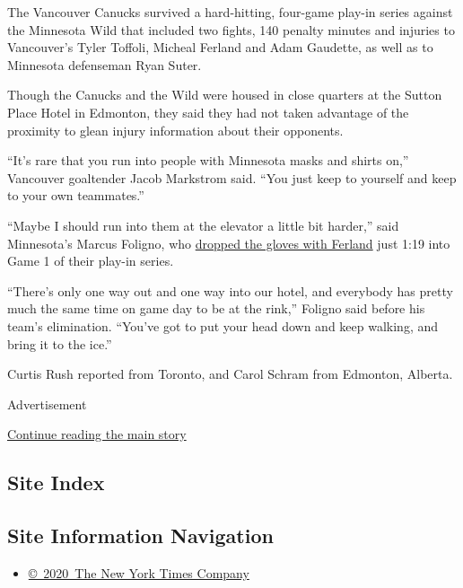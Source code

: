 The Vancouver Canucks survived a hard-hitting, four-game play-in series
against the Minnesota Wild that included two fights, 140 penalty minutes
and injuries to Vancouver's Tyler Toffoli, Micheal Ferland and Adam
Gaudette, as well as to Minnesota defenseman Ryan Suter.

Though the Canucks and the Wild were housed in close quarters at the
Sutton Place Hotel in Edmonton, they said they had not taken advantage
of the proximity to glean injury information about their opponents.

``It's rare that you run into people with Minnesota masks and shirts
on,'' Vancouver goaltender Jacob Markstrom said. ``You just keep to
yourself and keep to your own teammates.''

``Maybe I should run into them at the elevator a little bit harder,''
said Minnesota's Marcus Foligno, who
\href{https://www.youtube.com/watch?v=okGkhaQ2Xmk}{dropped the gloves
with Ferland} just 1:19 into Game 1 of their play-in series.

``There's only one way out and one way into our hotel, and everybody has
pretty much the same time on game day to be at the rink,'' Foligno said
before his team's elimination. ``You've got to put your head down and
keep walking, and bring it to the ice.''

Curtis Rush reported from Toronto, and Carol Schram from Edmonton,
Alberta.

Advertisement

\protect\hyperlink{after-bottom}{Continue reading the main story}

\hypertarget{site-index}{%
\subsection{Site Index}\label{site-index}}

\hypertarget{site-information-navigation}{%
\subsection{Site Information
Navigation}\label{site-information-navigation}}

\begin{itemize}
\tightlist
\item
  \href{https://help.nytimes3xbfgragh.onion/hc/en-us/articles/115014792127-Copyright-notice}{©~2020~The
  New York Times Company}
\end{itemize}

